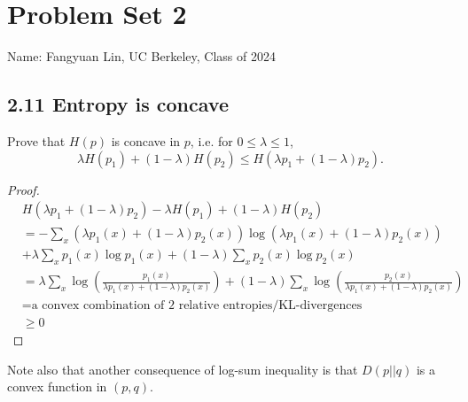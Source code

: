 \documentclass[../main.tex]{subfiles}
\begin{document}
\section*{Problem Set 2}
    Name: Fangyuan Lin, UC Berkeley, Class of 2024
\subsection*{2.11 Entropy is concave}
Prove that $H(p)$ is concave in $p$, i.e. for $0\leq \lambda\leq 1$,\begin{equation*}
    \lambda H(p_1)+(1-\lambda)H(p_2)\leq H(\lambda p_1 + (1-\lambda)p_2).
\end{equation*}
\begin{proof}
    \begin{align*}
        &H(\lambda p_1 + (1-\lambda)p_2) - \lambda H(p_1)+(1-\lambda)H(p_2) \\
        & = -\sum_x (\lambda p_1(x) + (1-\lambda)p_2(x))\log(\lambda p_1(x)+(1-\lambda)p_2(x))\\
        &+ \lambda\sum_x p_1(x)\log p_1(x) +(1-\lambda)\sum_x p_2(x)\log p_2(x)\\
        &= \lambda\sum_x\log(\frac{p_1(x)}{\lambda p_1(x)+(1-\lambda)p_2(x)}) +(1-\lambda)\sum_x\log(\frac{p_2(x)}{\lambda p_1(x)+(1-\lambda)p_2(x)})\\
        &= \text{a convex combination of 2 relative entropies/KL-divergences}\\
        &\geq 0
    \end{align*}
\end{proof}
Note also that another consequence of log-sum inequality is that $D(p||q)$ is a convex function in $(p,q)$.
\end{document}
